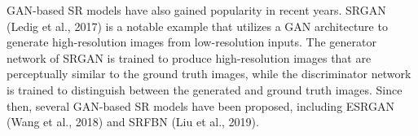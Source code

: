 GAN-based SR models have also gained popularity in recent years. SRGAN (Ledig et al., 2017) is a notable example that utilizes a GAN architecture to generate high-resolution images from low-resolution inputs. The generator network of SRGAN is trained to produce high-resolution images that are perceptually similar to the ground truth images, while the discriminator network is trained to distinguish between the generated and ground truth images. Since then, several GAN-based SR models have been proposed, including ESRGAN (Wang et al., 2018) and SRFBN (Liu et al., 2019).


